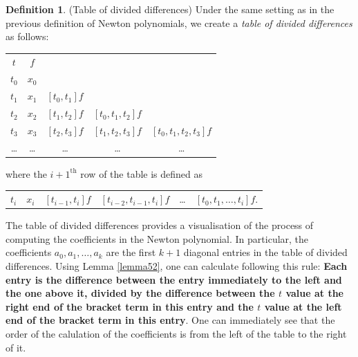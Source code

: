 \documentclass[a4paper,11pt,titlepage]{article}
\theoremstyle{definition}
\newtheorem{definition}{Definition}[section]
\theoremstyle{plain}
\theoremstyle{remark}
\begin{document}
\begin{definition}
    (Table of divided differences) Under the same setting as in the previous definition of Newton polynomials, we create a \textit{table of divided differences} as follows:

\begin{center}
\begin{tabular}{ c c c c c }
 $t$ & $f$ & & & \\ 
 $t_0$ & $x_0$ & & & \\  
 $t_1$ & $x_1$ & $[t_0,t_1]f$ & & \\
 $t_2$ & $x_2$ & $[t_1,t_2]f$ & $[t_0,t_1,t_2]f$ & \\
 $t_3$ & $x_3$ & $[t_2,t_3]f$ & $[t_1,t_2,t_3]f$ &  $[t_0,t_1,t_2,t_3]f$ \\
 \dots & \dots & \dots & \dots & \dots
\end{tabular}
\end{center}

where the $i+1^{\mathrm{th}}$ row of the table is defined as 

\begin{center}
\begin{tabular}{ c c c c c c }
$t_i$ & $x_i$ & $[t_{i-1},t_i]f$ & $[t_{i-2},t_{i-1},t_i]f$ & \dots & $[t_0,t_1,\dots,t_i]f.$
\end{tabular}
\end{center}
\end{definition}

The table of divided differences provides a visualisation of the process of computing the coefficients in the Newton polynomial. In particular, the coefficients $a_0,a_1,\dots,a_k$ are the first $k+1$ diagonal entries in the table of divided differences. Using Lemma \ref{lemma52}, one can calculate following this rule: \textbf{Each entry is the difference between the entry immediately to the left and the one above it, divided by the difference between the $t$ value at the right end of the bracket term in this entry and the $t$ value at the left end of the bracket term in this entry}. One can immediately see that the order of the calulation of the coefficients is from the left of the table to the right of it.
\end{document}
